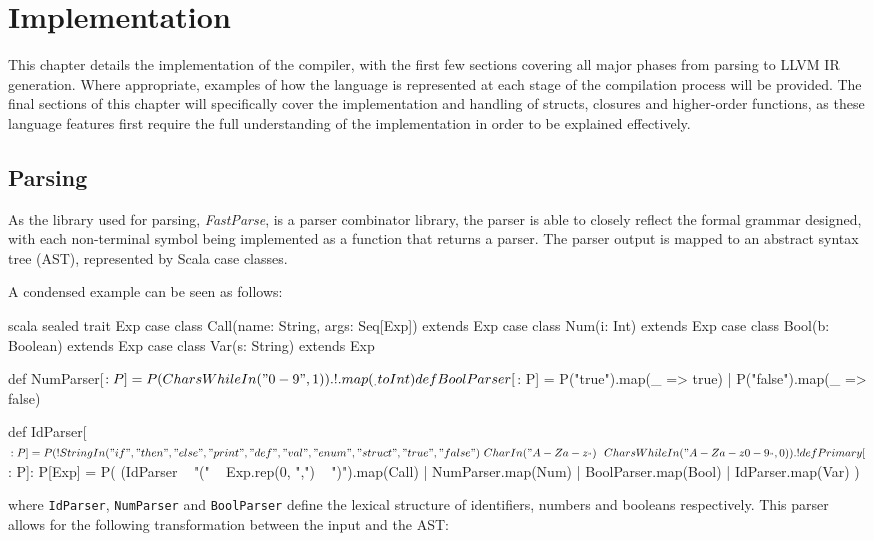 \chapter{Implementation}
\label{ch:implementation}

This chapter details the implementation of the compiler, with the first few sections covering all
major phases from parsing to LLVM IR generation. Where appropriate, examples of how the language is
represented at each stage of the compilation process will be provided. The final sections of this
chapter will specifically cover the implementation and handling of structs, closures and
higher-order functions, as these language features first require the full understanding of the
implementation in order to be explained effectively.

\section{Parsing}

As the library used for parsing, \emph{FastParse}, is a parser combinator library, the parser is
able to closely reflect the formal grammar designed, with each non-terminal symbol being implemented
as a function that returns a parser. The parser output is mapped to an abstract syntax tree (AST),
represented by Scala case classes.

A condensed example can be seen as follows:

\begin{code}{scala}
    sealed trait Exp
    case class Call(name: String, args: Seq[Exp]) extends Exp
    case class Num(i: Int) extends Exp
    case class Bool(b: Boolean) extends Exp
    case class Var(s: String) extends Exp

    def NumParser[$: P] =
        P(CharsWhileIn("0-9", 1)).!.map(_.toInt)

    def BoolParser[$: P] =
        P("true").map(_ => true) |
        P("false").map(_ => false)

    def IdParser[$: P] = P(
        !StringIn("if", "then", "else", "print", "def", "val", "enum", "struct", "true", "false")
        ~ CharIn("A-Za-z_") ~~ CharsWhileIn("A-Za-z0-9_", 0)
    ).!

    def Primary[$: P]: P[Exp] = P(
        (IdParser ~ "(" ~ Exp.rep(0, ",") ~ ")").map(Call) |
        NumParser.map(Num) |
        BoolParser.map(Bool) |
        IdParser.map(Var)
    )
\end{code}

\noindent where \texttt{IdParser}, \texttt{NumParser} and \texttt{BoolParser} define the lexical
structure of identifiers, numbers and booleans respectively. This parser allows for the following
transformation between the input and the AST:

